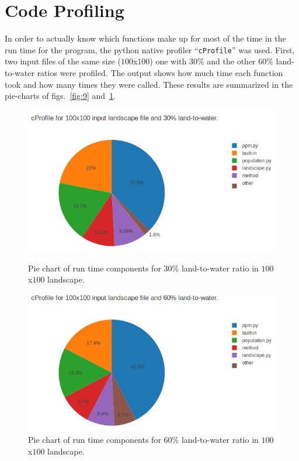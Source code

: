 \documentclass[12pt,a4paper]{article}
\begin{document}
\section{Code Profiling}

In order to actually know which functions make up for most of the time in the 
run time for the program, the python native profiler ``\texttt{cProfile}'' was 
used. First, two input files of the same size ($100$x$100$) one with $30\%$ and 
the other $60\%$ land-to-water ratios were profiled. The output shows how much 
time each function took and how many times they were called. These results are 
summarized in the pie-charts of figs.~\ref{fig:9} and~\ref{fig:10}.

\begin{figure}[ht]
\begin{minipage}[b]{0.45\linewidth}
\flushleft
\includegraphics[width=1.1\textwidth]{img/cProfile_30_100.png}
\caption{Pie chart of run time components for $30\%$ 
land-to-water ratio in $100$x$100$ landscape.}
\label{fig:9}
\end{minipage}
\hspace{0.5cm}
\begin{minipage}[b]{0.45\linewidth}
\flushleft
\includegraphics[width=1.1\textwidth]{img/cProfile_60_100.png}
\caption{Pie chart of run time components for $60\%$ 
land-to-water ratio in $100$x$100$ landscape.}
\label{fig:10}
\end{minipage}
\end{figure}
\end{document}
